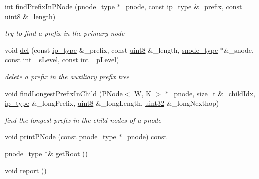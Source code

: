 \begin{DoxyCompactItemize}
int \hyperlink{classMPTree_ab18a63220f460f43c7eb17a6d9b692b0}{find\-Prefix\-In\-P\-Node} (\hyperlink{classMPTree_aaccc544aa2a8703f51ca45951f37a279}{pnode\-\_\-type} $\ast$\-\_\-pnode, const \hyperlink{classMPTree_a11032357a52017ffa6ad4e7ddedf3c23}{ip\-\_\-type} \&\-\_\-prefix, const \hyperlink{types_8h_a34ecedcf03a70dc91e4616212d79267d}{uint8} \&\-\_\-length)
\begin{DoxyCompactList}\small\item\em try to find a prefix in the primary node \end{DoxyCompactList}\item 
void \hyperlink{classMPTree_a0397e87c8e2c541734c8512300f317a4}{del} (const \hyperlink{classMPTree_a11032357a52017ffa6ad4e7ddedf3c23}{ip\-\_\-type} \&\-\_\-prefix, const \hyperlink{types_8h_a34ecedcf03a70dc91e4616212d79267d}{uint8} \&\-\_\-length, \hyperlink{classMPTree_a456aa661f3322ceae1d38bfbb39b572c}{snode\-\_\-type} $\ast$\&\-\_\-snode, const int \-\_\-s\-Level, const int \-\_\-p\-Level)
\begin{DoxyCompactList}\small\item\em delete a prefix in the auxiliary prefix tree \end{DoxyCompactList}\item 
void \hyperlink{classMPTree_a9b4591cca6b68b689413e436ac1c4510}{find\-Longest\-Prefix\-In\-Child} (\hyperlink{structPNode}{P\-Node}$<$ \hyperlink{test__u128_8cpp_ab21b528bc38899d04d3a7053e52fb797}{W}, K $>$ $\ast$\-\_\-pnode, size\-\_\-t \&\-\_\-child\-Idx, \hyperlink{classMPTree_a11032357a52017ffa6ad4e7ddedf3c23}{ip\-\_\-type} \&\-\_\-long\-Prefix, \hyperlink{types_8h_a34ecedcf03a70dc91e4616212d79267d}{uint8} \&\-\_\-long\-Length, \hyperlink{types_8h_abd01e8e67e3d94cab04ecaaf4f85ac1b}{uint32} \&\-\_\-long\-Nexthop)
\begin{DoxyCompactList}\small\item\em find the longest prefix in the child nodes of a pnode \end{DoxyCompactList}\item 
void \hyperlink{classMPTree_acd0b63c9580ca45b254114d03e8302c0}{print\-P\-Node} (const \hyperlink{classMPTree_aaccc544aa2a8703f51ca45951f37a279}{pnode\-\_\-type} $\ast$\-\_\-pnode) const 
\item 
\hyperlink{classMPTree_aaccc544aa2a8703f51ca45951f37a279}{pnode\-\_\-type} $\ast$\& \hyperlink{classMPTree_aa82b228f096ce70301f1a932e94cd306}{get\-Root} ()
\item 
void \hyperlink{classMPTree_ae01a6521f203c038781dce94a4e573f1}{report} ()
\end{DoxyCompactItemize}
